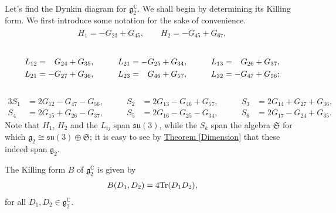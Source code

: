 \noindent\\ Let's find the Dynkin diagram for $\mathfrak{g}_2^\mathbb{C}$. We shall begin by determining its Killing form. We first introduce some notation for the sake of convenience.
\begin{align*}
\begin{split}
H_1 = -G_{23} + G_{45},\qquad H_2 = -G_{45} + G_{67},
\end{split}
\end{align*}\\[-2.5\linespacing]
\begin{alignat*}{3}
L_{12} &= \hphantom{-}G_{24} + G_{35},\qquad&L_{21} &= -G_{25} + G_{34},\qquad&L_{13} &= \hphantom{-}G_{26} + G_{37},\\
L_{21} &= -G_{27} + G_{36},\qquad&L_{23} &= \hphantom{-}G_{46} + G_{57},\qquad&L_{32} &= -G_{47} + G_{56};
\end{alignat*}\\[-2.25\linespacing]
\begin{alignat*}{3}
S_1 &= 2G_{12} - G_{47} - G_{56},\qquad&S_2 &= 2G_{13} - G_{46} + G_{57},\qquad&S_3 &= 2G_{14} + G_{27} + G_{36},\\
S_4 &= 2G_{15} + G_{26} - G_{37},\qquad&S_5 &= 2G_{16} - G_{25} - G_{34},\qquad&S_6 &= 2G_{17} - G_{24} + G_{35}.
\end{alignat*}
\noindent Note that $H_1$, $H_2$ and the $L_{ij}$ span $\mathfrak{su}(3)$, while the $S_k$ span the algebra $\mathfrak{S}$ for which $\mathfrak{g}_2 \cong \mathfrak{su}(3) \oplus \mathfrak{S}$; it is easy to see by \hyperref[Dimension]{Theorem \ref*{Dimension}} that these indeed span $\mathfrak{g}_2$.\\

\newpage

\noindent\begin{theorem} The Killing form $B$ of $\mathfrak{g}_2^\mathbb{C}$ is given by
\begin{align*}
\begin{split}
B(D_1, D_2) = 4\textup{Tr}(D_1D_2),
\end{split}
\end{align*}
\noindent for all $D_1, D_2 \in \mathfrak{g}_2^\mathbb{C}$.
\end{theorem}

